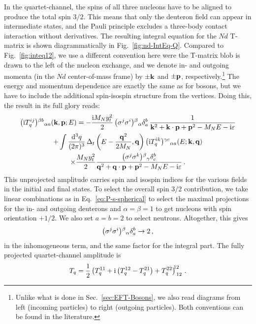 In the quartet-channel, the spins of all three nucleons have to be aligned to 
produce the total spin $3/2$.  This means that only the deuteron field can 
appear in intermediate states, and the Pauli principle excludes a three-body 
contact interaction without derivatives.  The resulting integral equation for 
the $Nd$ T-matrix is shown diagrammatically in Fig.~\ref{fig:nd-IntEq-Q}.  
Compared to Fig.~\ref{fig:inteq12}, we use a different convention here were the 
T-matrix blob is drawn to the left of the nucleon exchange, and we denote in- 
and outgoing momenta (in the $Nd$ center-of-mass frame) by $\pm\mathbf{k}$ and 
$\pm\mathbf{p}$, respectively.\footnote{Unlike what is done in 
Sec.~\ref{sec:EFT-Bosons}, we also read diagrams from left (incoming particles) 
to right (outgoing particles).  Both conventions can be found in the 
literature.}  The energy and momentum dependence are exactly the same as for 
bosons, but we have to include the additional spin-isospin structure from the 
vertices.  Doing this, the result in its full glory reads:
%
\begin{multline}
 \idxx{\ii T_q^{ij}}{\beta b}{\alpha a}(\vk,\vp;E)
 = -\frac{\ii\MN\yt^2}{2}\,\idxx{\sigma^j\sigma^i}\beta\alpha\delta^b_a
 \,\frac{1}{\vk^2+\vk\cdot\vp+\vp^2-\MN E-\ii\eps}\\
 +\int\frac{\dd^3 q}{(2\pi)^3} \,
 \Delta_t\left(E-\frac{\vq^2}{2\MN},\vq\right)
 \idxx{\ii T_q^{ik}}{\gamma c}{\alpha a}(E;\vk,\vq)\\
 \times\frac{\MN\yt^2}{2}
 \frac{\idxx{\sigma^j\sigma^k}\beta\gamma\delta^b_c}
 { \vq^2+\vq\cdot\vp+\vp^2-\MN E-\ii\eps} \,.
\label{eq:nd-IntEq-Q-raw}
\end{multline}
%
This unprojected amplitude carries spin and isospin indices for the various 
fields in the initial and final states.  To select the overall spin $3/2$ 
contribution, we take linear combinations as in Eq.~\eqref{eq:P-s-spherical} to 
select the maximal projections for the in- and outgoing deuterons and 
$\alpha=\beta=1$ to get nucleons with spin orientation ${+}1/2$.  We also set 
$a=b=2$ to select neutrons.  Altogether, this gives
%
\begin{equation}
 \big(\sigma^j\sigma^i\big){}^{\beta}{}_{\alpha}\delta^b_a \rightarrow 2 \,,
\end{equation}
%
in the inhomogeneous term, and the same factor for the integral part.  The 
fully projected quartet-channel amplitude is
%
\begin{equation}
 T_q = \frac{1}{2}\idxxx{T_q^{11} + \ii\left(T_q^{12} - T_q^{21}\right)
 + T_q^{22}}{12}{12} \,.
\label{eq:T-q}
\end{equation}

